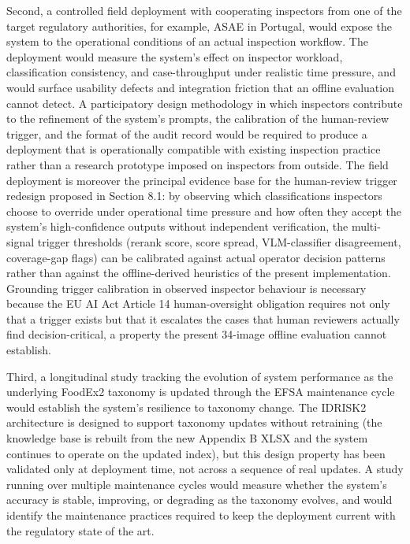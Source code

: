 Second, a controlled field deployment with cooperating inspectors from one of the target regulatory authorities, for example, ASAE in Portugal, would expose the system to the operational conditions of an actual inspection workflow. The deployment would measure the system's effect on inspector workload, classification consistency, and case-throughput under realistic time pressure, and would surface usability defects and integration friction that an offline evaluation cannot detect. A participatory design methodology in which inspectors contribute to the refinement of the system's prompts, the calibration of the human-review trigger, and the format of the audit record would be required to produce a deployment that is operationally compatible with existing inspection practice rather than a research prototype imposed on inspectors from outside. The field deployment is moreover the principal evidence base for the human-review trigger redesign proposed in Section 8.1: by observing which classifications inspectors choose to override under operational time pressure and how often they accept the system's high-confidence outputs without independent verification, the multi-signal trigger thresholds (rerank score, score spread, VLM-classifier disagreement, coverage-gap flags) can be calibrated against actual operator decision patterns rather than against the offline-derived heuristics of the present implementation. Grounding trigger calibration in observed inspector behaviour is necessary because the EU AI Act Article 14 human-oversight obligation requires not only that a trigger exists but that it escalates the cases that human reviewers actually find decision-critical, a property the present 34-image offline evaluation cannot establish.

Third, a longitudinal study tracking the evolution of system performance as the underlying FoodEx2 taxonomy is updated through the EFSA maintenance cycle would establish the system's resilience to taxonomy change. The IDRISK2 architecture is designed to support taxonomy updates without retraining (the knowledge base is rebuilt from the new Appendix B XLSX and the system continues to operate on the updated index), but this design property has been validated only at deployment time, not across a sequence of real updates. A study running over multiple maintenance cycles would measure whether the system's accuracy is stable, improving, or degrading as the taxonomy evolves, and would identify the maintenance practices required to keep the deployment current with the regulatory state of the art.
